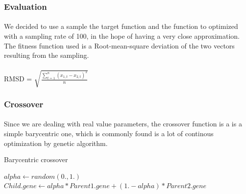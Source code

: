 \documentclass{article}
\begin{document}

    \subsubsection{Evaluation} %
    \label{ssub:Evaluation}
      
      \paragraph{} %
      \label{par:}
        We decided to use a sample the target function and the function to optimized
        with a sampling rate of 100, in the hope of having a very close approximation. 
        The fitness function used is a Root-mean-square deviation of the two vectors
        resulting from the sampling.
        \\
        \\
        RMSD = $\sqrt{\frac{\sum_{t=1}^n (x_{1,t} - x_{2,t})^2}{n}}$

    
    \subsubsection{Crossover} %
    \label{ssub:Crossover}
      
      \paragraph{} %
      \label{par:}
      
        Since we are dealing with real value parameters, the crossover function is a
        is a simple barycentric one, which is commonly found is a lot of continous
        optimization by genetic algorithm.
      
      \begin{algorithm}
      \caption{Barycentric crossover}\label{pseudo1}
      \begin{algorithmic}[1]
        \State $alpha\gets random(0.,1.)$ 
        \State $Child.gene\gets alpha * Parent1.gene + (1. - alpha) * Parent2.gene$
      \EndFor
      \EndProcedure
      \end{algorithmic}
      \end{algorithm}

    
    
\end{document}
